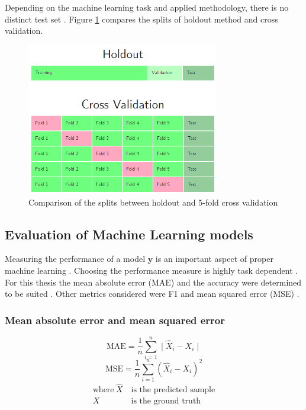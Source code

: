 \documentclass[draft,final,oneside]{vutinfth} %
\begin{document}
Depending on the machine learning task and applied methodology, there is no distinct test set \cite{holdoutcrossvalidation}. Figure \ref{fig:holdoutvscv} compares the splits of holdout method and cross validation.

\begin{figure}[ht]
	\centering
  	\includegraphics[width=0.75\textwidth]{graphics/holdoutvscv.png}
	\caption{Comparison of the splits between holdout and 5-fold cross validation}
	\label{fig:holdoutvscv}
\end{figure}

\subsection{Evaluation of Machine Learning models}

Measuring the performance of a model $\boldsymbol{y}$ is an important aspect of proper machine learning \cite{performanceevaluation}. Choosing the performance measure is highly task dependent \cite{performanceevaluation}. For this thesis the mean absolute error (MAE) and the accuracy were determined to be suited \cite{accuracy}. Other metrics considered were F1 and mean squared error (MSE) \cite{accuracy} \cite{Powers2008EvaluationFP}.

\subsubsection{Mean absolute error and mean squared error}
\begin{equation}
\text{MAE} = \frac{1}{n}\textstyle \sum_{i=1}^n \displaystyle\mid \hat{X}_i - X_i \mid
\end{equation}
\begin{equation}
\text{MSE} = \frac{1}{n}\textstyle \sum_{i=1}^n \displaystyle\left( \hat{X}_i - X_i \right)^2
\end{equation}
\begin{align*}
\text{where}~\hat{X}&~\text{is the predicted sample} \\
X&~\text{is the ground truth}
\end{align*}
\end{document}
